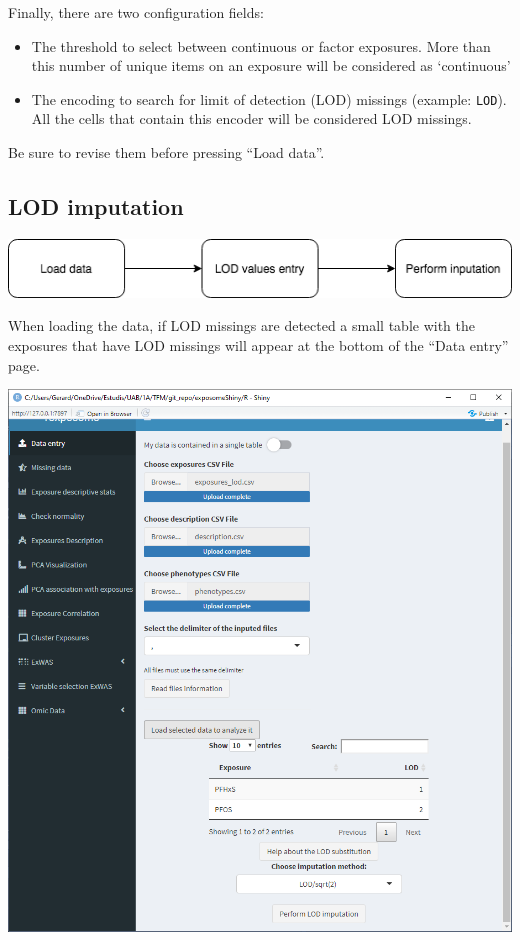 \documentclass[
]{book}
\providecommand{\tightlist}{%
  \setlength{\itemsep}{0pt}\setlength{\parskip}{0pt}}
\begin{document}
Finally, there are two configuration fields:

\begin{itemize}
\tightlist
\item
  The threshold to select between continuous or factor exposures. More than this number of unique items on an exposure will be considered as `continuous'
\item
  The encoding to search for limit of detection (LOD) missings (example: \texttt{LOD}). All the cells that contain this encoder will be considered LOD missings.
\end{itemize}

Be sure to revise them before pressing ``Load data''.

\hypertarget{lod-imputation}{%
\subsection{LOD imputation}\label{lod-imputation}}

\includegraphics{images/analysis1_1.png}

When loading the data, if LOD missings are detected a small table with the exposures that have LOD missings will appear at the bottom of the ``Data entry'' page.

\includegraphics{images/analysis1_2_3.png}
\end{document}
